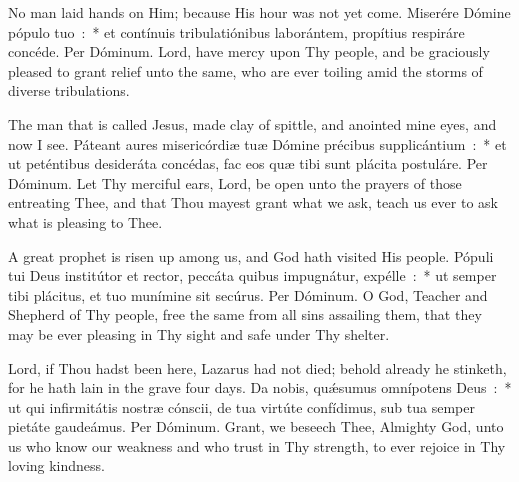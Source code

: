 {{  
  {No man laid hands on Him; because His hour was not yet come.}
  {Miserére Dómine pópulo tuo~:~* et contínuis tribulatiónibus laborántem, propítius respiráre concéde. Per Dóminum.}
  {Lord, have mercy upon Thy people, and be graciously pleased to grant relief unto the same, who are ever toiling amid the storms of diverse tribulations.}

  {The man that is called Jesus, made clay of spittle, and anointed mine eyes, and now I see.}
  {Páteant aures misericórdiæ tuæ Dómine précibus supplicántium~:~* et ut peténtibus desideráta concédas, fac eos quæ tibi sunt plácita postuláre. Per Dóminum.}
  {Let Thy merciful ears, Lord, be open unto the prayers of those entreating Thee, and that Thou mayest grant what we ask, teach us ever to ask what is pleasing to Thee.}

  {A great prophet is risen up among us, and God hath visited His people.}
  {Pópuli tui Deus institútor et rector, peccáta quibus impugnátur, expélle~:~* ut semper tibi plácitus, et tuo munímine sit secúrus. Per Dóminum.}
  {O God, Teacher and Shepherd of Thy people, free the same from all sins assailing them, that they may be ever pleasing in Thy sight and safe under Thy shelter.}

  \let\vrtitle=\undefined
  {Lord, if Thou hadst been here, Lazarus had not died; behold already he stinketh, for he hath lain in the grave four days.}
  {Da nobis, quǽsumus omnípotens Deus~:~* ut qui infirmitátis nostræ cónscii, de tua virtúte confídimus, sub tua semper pietáte gaudeámus. Per Dóminum.}
  {Grant, we beseech Thee, Almighty God, unto us who know our weakness and who trust in Thy strength, to ever rejoice in Thy loving kindness.}
}
  
}
